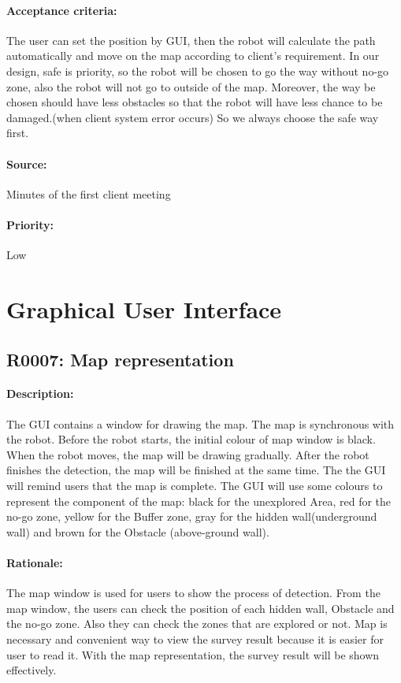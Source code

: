 \documentclass[11pt, a4paper]{report}
\begin{document}
\paragraph{Acceptance criteria:}
The user can set the position by GUI, then the robot will calculate the path automatically and move on the map according to client's requirement. In our design, safe is priority, so the robot will be chosen to go the way without no-go zone, also the robot will not go to outside of the map. Moreover, the way be chosen should have less obstacles so that the robot will have less chance to be damaged.(when client system error occurs)  So we always choose the safe way first.    
\paragraph{Source:}
 Minutes of the first client meeting   
\paragraph{Priority:}
Low


\section{Graphical User Interface}
\subsection{R0007: Map representation}
\paragraph{Description:}
The GUI contains a window for drawing the map. The map is synchronous with the robot. Before the  robot starts, the initial colour of map window is black. When the robot moves, the map will be drawing gradually. After the robot finishes the detection, the map will be finished at the same time. The the GUI will remind users that the map is complete. The GUI will use some colours to represent the component of the map: black for the unexplored Area, red for the no-go zone, yellow for the Buffer zone, gray for the hidden wall(underground wall) and brown for the Obstacle (above-ground wall).
\paragraph{Rationale:}
The map window is used for users to show the process of detection. From the map window, the users can check the position of each hidden wall, Obstacle and the no-go zone. Also they can check the zones that are explored or not. Map is necessary and convenient way to view the survey result because it is easier for user to read it. With the map representation, the survey result will be shown effectively.
\end{document}

